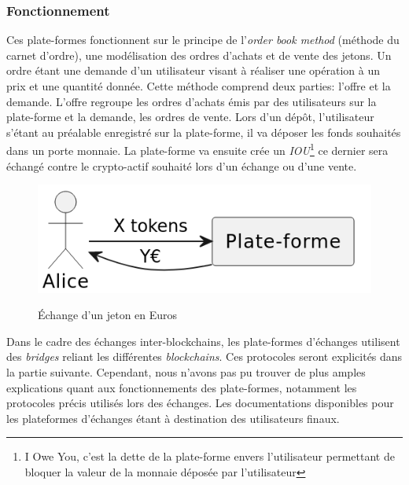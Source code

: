 \subsubsection{Fonctionnement}
Ces plate-formes fonctionnent sur le principe de l'\textit{order book method} (méthode du carnet d'ordre\cite{orderBook}), une modélisation des ordres d'achats et de vente des jetons.
Un ordre étant une demande d'un utilisateur visant à réaliser une opération à un prix et une quantité donnée. 
Cette méthode comprend deux parties: l'offre et la demande. L'offre regroupe les ordres d'achats émis par des utilisateurs sur la plate-forme et la demande, les ordres de vente.
Lors d'un dépôt, l'utilisateur s'étant au préalable enregistré sur la plate-forme, il va déposer les fonds souhaités dans un porte monnaie. 
La plate-forme va ensuite crée un \textit{IOU}\footnote{I Owe You, c'est la dette de la plate-forme envers l'utilisateur permettant de bloquer la valeur de la monnaie déposée par l'utilisateur\cite{IOU}} 
ce dernier sera échangé contre le crypto-\gls{actif} souhaité lors d'un échange ou d'une vente. \\ 
\begin{figure}[h!]
    \centering
    \includegraphics[scale=0.5]{centralisation/echange.png}
    \label{fig:simplifiedcex}
    \caption{Échange d'un jeton en Euros}
\end{figure}
Dans le cadre des échanges inter-\gls{blockchain}s, les plate-formes d'échanges utilisent des \textit{bridges} reliant les différentes \textit{\gls{blockchain}s}. 
Ces protocoles seront explicités dans la partie suivante.
Cependant, nous n'avons pas pu trouver de plus amples explications quant aux fonctionnements des plate-formes, notamment les protocoles précis utilisés lors des échanges. 
Les documentations disponibles pour les plateformes d'échanges étant à destination des utilisateurs finaux. 


